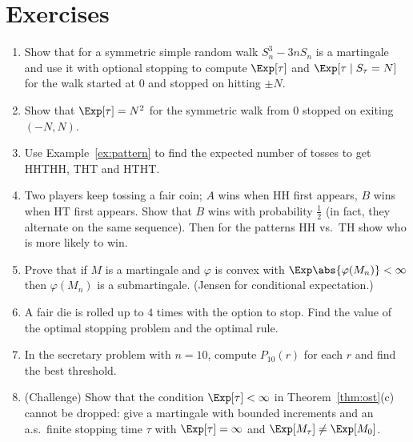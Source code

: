 \section*{Exercises}

\begin{enumerate}
\item Show that for a symmetric simple random walk $S_n^3-3nS_n$ is a martingale and
use it with optional stopping to compute $\Exp[\tau]$ and
$\Exp[\tau\mid S_\tau=N]$ for the walk started at $0$ and stopped on hitting $\pm N$.
\item Show that $\Exp[\tau]=N^2$ for the symmetric walk from $0$ stopped on exiting
$(-N,N)$.
\item Use Example~\ref{ex:pattern} to find the expected number of tosses to get HHTHH,
THT and HTHT.
\item Two players keep tossing a fair coin; $A$ wins when HH first appears, $B$ wins when
HT first appears. Show that $B$ wins with probability $\tfrac12$ (in fact, they alternate
on the same sequence). Then for the patterns HH vs.\ TH show who is more likely to win.
\item Prove that if $M$ is a martingale and $\varphi$ is convex with $\Exp\abs{\varphi(M_n)}<\infty$
then $\varphi(M_n)$ is a submartingale. (Jensen for conditional expectation.)
\item A fair die is rolled up to $4$ times with the option to stop. Find the value of the
optimal stopping problem and the optimal rule.
\item In the secretary problem with $n=10$, compute $P_{10}(r)$ for each $r$ and find the best
threshold.
\item (Challenge) Show that the condition $\Exp[\tau]<\infty$ in
Theorem~\ref{thm:ost}(c) cannot be dropped: give a martingale with bounded increments and
an a.s.\ finite stopping time $\tau$ with $\Exp[\tau]=\infty$ and $\Exp[M_\tau]\ne\Exp[M_0]$.
\end{enumerate}
